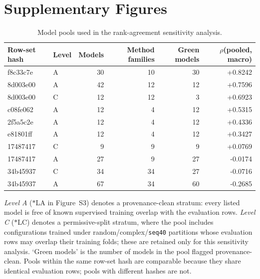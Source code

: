 \documentclass[11pt,a4paper]{article}
\begin{document}
\section*{Supplementary Figures}
\begin{landscape}\begin{table}[h]\centering\footnotesize
\begin{threeparttable}
\caption{Model pools used in the rank-agreement sensitivity analysis.}\label{tab:s4pools}
\begin{tabular}{@{}llrrrr@{}}\toprule
Row-set hash & Level & Models & Method families & Green models & $\rho$(pooled, macro) \\
\midrule
f8c33c7e & A & 30 & 10 & 30 & +0.8242 \\
8d003e00 & A & 42 & 12 & 12 & +0.7596 \\
8d003e00 & C & 12 & 12 & 3 & +0.6923 \\
c08fe062 & A & 12 & 4 & 12 & +0.5315 \\
2f5a5c2e & A & 12 & 4 & 12 & +0.4336 \\
e81801ff & A & 12 & 4 & 12 & +0.3427 \\
17487417 & C & 9 & 9 & 9 & +0.0769 \\
17487417 & A & 27 & 9 & 27 & -0.0174 \\
34b45937 & C & 34 & 34 & 27 & -0.0716 \\
34b45937 & A & 67 & 34 & 60 & -0.2685 \\
\bottomrule\end{tabular}
\begin{tablenotes}\footnotesize
\item \emph{Level A} ($\ast$LA in Figure~S3) denotes a provenance-clean stratum:
every listed model is free of known supervised training overlap with the evaluation
rows. \emph{Level C} ($\ast$LC) denotes a permissive-split stratum, where the pool
includes configurations trained under random/complex/\texttt{seq40} partitions whose
evaluation rows may overlap their training folds; these are retained only for this
sensitivity analysis. `Green models' is the number of models in the pool flagged
provenance-clean. Pools within the same row-set hash are comparable because they
share identical evaluation rows; pools with different hashes are not.
\end{tablenotes}\end{threeparttable}\end{table}\end{landscape}
\end{document}
